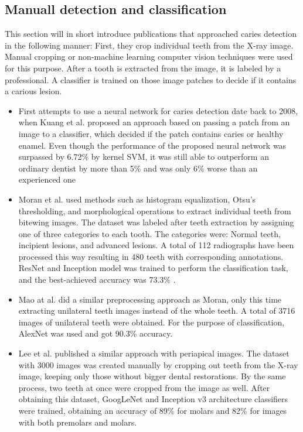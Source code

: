 \subsection{Manuall detection and classification}
This section will in short introduce publications that approached caries detection in the following manner: First, they crop individual teeth from the X-ray image. Manual cropping or non-machine learning computer vision techniques were used for this purpose. After a tooth is extracted from the image, it is labeled by a professional. A classifier is trained on those image patches to decide if it contains a carious lesion.
\begin{itemize}
    \item First attempts to use a neural network for caries detection date back to 2008, when Kuang et al. \cite{Kuang2008} proposed an approach based on passing a patch from an image to a classifier, which decided if the patch contains caries or healthy enamel. Even though the performance of the proposed neural network was surpassed by 6.72\% by kernel SVM, it was still able to outperform an ordinary dentist by more than 5\% and was only 6\% worse than an experienced one
    \item Moran et al.\cite{Moran2021} used methods such as histogram equalization, Otsu's thresholding, and morphological operations to extract individual teeth from bitewing images. The dataset was labeled after teeth extraction by assigning one of three categories to each tooth. The categories were: Normal teeth, incipient lesions, and advanced lesions. A total of 112 radiographs have been processed this way resulting in 480 teeth with corresponding annotations. ResNet and Inception model was trained to perform the classification task, and the best-achieved accuracy was 73.3\% \cite{Moran2021}.
    \item{Mao at al. \cite{Mao2021}} did a similar preprocessing approach as Moran, only this time extracting unilateral teeth images instead of the whole teeth. A total of 3716 images of unilateral teeth were obtained. For the purpose of classification, AlexNet was used and got 90.3\% accuracy.
    \item{Lee et al. \cite{Lee2018}} published a similar approach with periapical images. The dataset with 3000 images was created manually by cropping out teeth from the X-ray image, keeping only those without bigger dental restorations. By the same process, two teeth at once were cropped from the image as well. After obtaining this dataset, GoogLeNet and Inception v3 architecture classifiers were trained, obtaining an accuracy of 89\%  for molars and 82\% for images with both premolars and molars.
\end{itemize}


